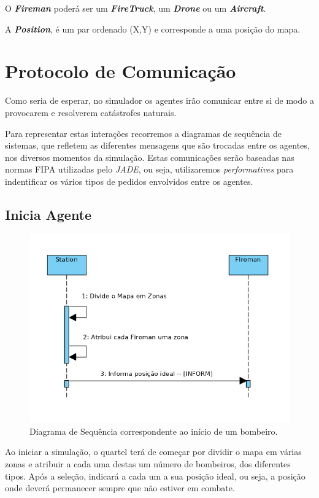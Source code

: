\documentclass[a4paper]{article}
\begin{document}
O \textbf{\textit{Fireman}} poderá ser um \textbf{\textit{FireTruck}}, um \textbf{\textit{Drone}} ou um \textbf{\textit{Aircraft}}.

A \textbf{\textit{Position}}, é um par ordenado (X,Y) e corresponde a uma posição do mapa.




\section{Protocolo de Comunicação}
Como seria de esperar, no simulador os agentes irão comunicar entre si de modo a provocarem e resolverem catástrofes naturais.

Para representar estas interações recorremos a diagramas de sequência de sistemas, que refletem as diferentes mensagens que são trocadas entre os agentes, nos diversos momentos da simulação. Estas comunicações serão baseadas nas normas FIPA utilizadas pelo \textit{JADE}, ou seja, utilizaremos \textit{performatives} para indentificar os vários tipos de pedidos envolvidos entre os agentes.

\subsection{Inicia Agente}
\begin{figure}[h!]
    \centering
    \includegraphics[scale=0.4]{IniciaAgent_v3.png}
    \caption{Diagrama de Sequência correspondente ao início de um bombeiro.}
\end{figure}
Ao iniciar a simulação, o quartel terá de começar por dividir o mapa em várias zonas e atribuir a cada uma destas um número de bombeiros, dos diferentes tipos. Após a seleção, indicará a cada um a sua posição ideal, ou seja, a posição onde deverá permanecer sempre que não estiver em combate.
\end{document}
